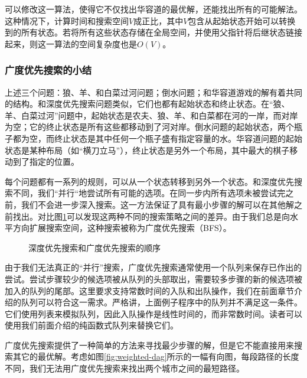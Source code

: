 \documentclass[b5paper]{ctexart}
\begin{document}
可以修改这一算法，使得它不仅找出华容道的最优解，还能找出所有的可能解法。这种情况下，计算时间和搜索空间$V$成正比，其中$V$包含从起始状态开始可以转换到的所有状态。若将所有这些状态存储在全局空间，并使用父指针将后继状态链接起来，则这一算法的空间复杂度也是$O(V)$。

\subsubsection{广度优先搜索的小结}
 

上述三个问题：狼、羊、和白菜过河问题；倒水问题；和华容道游戏的解有着共同的结构。和深度优先搜索问题类似，它们也都有起始状态和终止状态。在“狼、羊、白菜过河”问题中，起始状态是农夫、狼、羊、和白菜都在河的一岸，而对岸为空；它的终止状态是所有这些都移动到了河对岸。倒水问题的起始状态，两个瓶子都为空，而终止状态是其中任何一个瓶子盛有指定容量的水。华容道问题的起始状态是某种布局（如“横刀立马”），终止状态是另外一个布局，其中最大的棋子移动到了指定的位置。

每个问题都有一系列的规则，可以从一个状态转移到另外一个状态。和深度优先搜索不同，我们“并行“地尝试所有可能的选项。在同一步内所有选项未被尝试完之前，我们不会进一步深入搜索。这一方法保证了具有最小步骤的解可以在其他解之前找出。对比图\ref{fig:dfs-bfs-tree}可以发现这两种不同的搜索策略之间的差异。由于我们总是向水平方向扩展搜索空间，这种搜索被称为广度优先搜索（BFS）。

\begin{figure}[htbp]
 \centering
 \caption{深度优先搜索和广度优先搜索的顺序}
 \label{fig:dfs-bfs-tree}
\end{figure}

由于我们无法真正的“并行”搜索，广度优先搜索通常使用一个队列来保存已作出的尝试。尝试步骤较少的候选项被从队列的头部取出，需要较多步骤的新的候选项被加入的队列的尾部。这里要求支持常数时间的入队和出队操作，我们在前面章节介绍的队列可以符合这一需求。严格讲，上面例子程序中的队列并不满足这一条件。它们使用列表来模拟队列，因此入队操作是线性时间的，而非常数时间。读者可以使用我们前面介绍的纯函数式队列来替换它们。

广度优先搜索提供了一种简单的方法来寻找最少步骤的解，但是它不能直接用来搜索其它的最优解。考虑如图\ref{fig:weighted-dag}所示的一幅有向图，每段路径的长度不同，我们无法用广度优先搜索来找出两个城市之间的最短路径。
\end{document}

